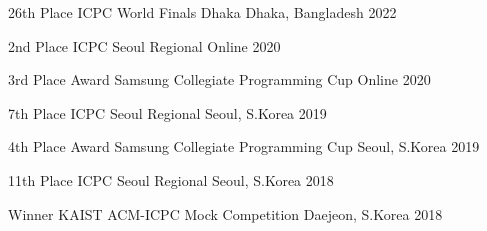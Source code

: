



\begin{cvhonors}

  \cvhonor
    {26th Place} %
    {ICPC World Finals Dhaka} %
    {Dhaka, Bangladesh} %
    {2022} %

\end{cvhonors}




\begin{cvhonors}

  \cvhonor
    {2nd Place} %
    {ICPC Seoul Regional} %
    {Online} %
    {2020} %

  \cvhonor
    {3rd Place Award} %
    {Samsung Collegiate Programming Cup} %
    {Online} %
    {2020} %

  \cvhonor
    {7th Place} %
    {ICPC Seoul Regional} %
    {Seoul, S.Korea} %
    {2019} %
    
  \cvhonor
    {4th Place Award} %
    {Samsung Collegiate Programming Cup} %
    {Seoul, S.Korea} %
    {2019} %

  \cvhonor
    {11th Place} %
    {ICPC Seoul Regional} %
    {Seoul, S.Korea} %
    {2018} %

  \cvhonor
    {Winner} %
    {KAIST ACM-ICPC Mock Competition} %
    {Daejeon, S.Korea} %
    {2018} %

\end{cvhonors}

